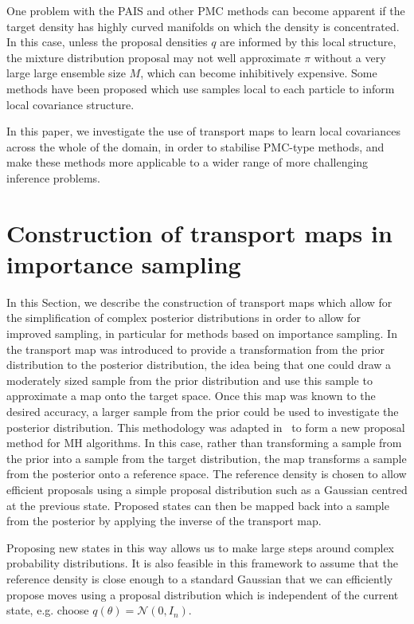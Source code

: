 \documentclass[final]{siamltex}
\begin{document}
One problem with the PAIS and other PMC methods can become apparent if
the target density has highly curved manifolds on which the density is
concentrated. In this
case, unless the proposal densities $q$ are informed by this local
structure, the mixture distribution proposal may not well approximate
$\pi$ without a very large large ensemble size $M$, which can become
inhibitively expensive. Some methods have been
proposed\cite{douc2007minimum}
which use samples local to each particle to inform local covariance
structure.

In this paper, we investigate the use of transport maps to learn local
covariances across the whole of the domain, in order to stabilise
PMC-type methods, and make these methods more applicable to a wider
range of more challenging inference problems.

\section{Construction of transport maps in importance sampling} \label{sec:map}
In this Section, we describe the construction of transport maps which
allow for the simplification of complex posterior distributions in
order to allow for improved sampling, in particular for methods based
on importance sampling.
In~\cite{el2012bayesian} the transport map was introduced to provide a transformation from the prior
distribution to the posterior distribution, the idea being that one could draw a moderately sized
sample from the prior distribution and use this sample to approximate a map onto the target space.
Once this map was known to the desired accuracy, a larger sample from the prior could be used to
investigate the posterior distribution. This
methodology was adapted in~\cite{parno2014transport} to form a new proposal method for MH
algorithms. In this case, rather than transforming a sample from the prior into a sample from the target
distribution, the map transforms a sample from the posterior onto a reference space.
The reference density is chosen to allow efficient proposals using a simple proposal
distribution such as a Gaussian centred at the previous state. Proposed states can then be mapped back into a sample from the posterior by applying the inverse of the transport map.

Proposing new states in this way allows us to make large steps around complex probability distributions.
It is also feasible in this framework to assume that the reference density is close enough to a standard Gaussian that we can efficiently propose moves using a proposal distribution which is independent of the current state, e.g. choose $q(\theta) = \mathcal{N}(0,I_n)$.
\end{document}
